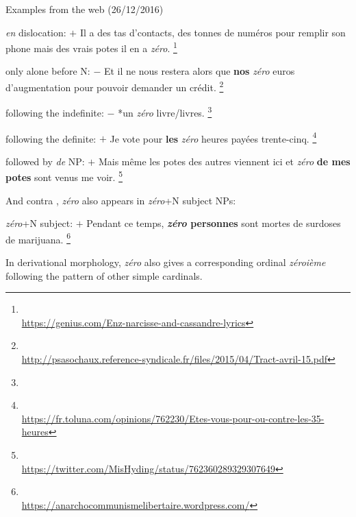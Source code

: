 \documentclass[output=paper]{langsci/langscibook}
\begin{document}
  
\newpage 
\ea\label{exampleZero} %
Examples from the web (26/12/2016)
\begin{description}
\item \emph{en} dislocation: $+$ \fldr{}  Il a des tas d'contacts, des tonnes de numéros pour remplir son phone mais des vrais potes il en a \emph{zéro}.%
\footnote{\\\protect\url{https://genius.com/Enz-narcisse-and-cassandre-lyrics}}
\item only alone before N: $-$ \fldr{} Et il ne nous restera alors que \textbf{nos} \emph{zéro} euros d'augmentation pour pouvoir demander un crédit.%
\footnote{\\\url{http://psasochaux.reference-syndicale.fr/files/2015/04/Tract-avril-15.pdf}}
\item following the indefinite: $-$ \fldr{} *un \emph{zéro} livre/livres.%
\footnote{}
\item following the definite: $+$ \fldr{}  Je vote pour \textbf{les} \emph{zéro} heures payées trente-cinq.%
\footnote{\\\url{https://fr.toluna.com/opinions/762230/Etes-vous-pour-ou-contre-les-35-heures}}
\item followed by \emph{de} NP: $+$ \fldr{}  Mais même les potes des autres viennent ici et \emph{zéro} \textbf{de mes potes} sont venus me voir.%
\footnote{\\\url{https://twitter.com/MisHyding/status/762360289329307649}}
\end{description}

\noindent And contra \citet{Saulnier10}, \emph{zéro} also appears in \emph{zéro}+N subject NPs:
\begin{description}
\item \emph{zéro}+N subject: $+$ \fldr{}  Pendant ce temps, \textbf{\emph{zéro} personnes} sont mortes de  surdoses de marijuana.%
\footnote{\\\url{https://anarchocommunismelibertaire.wordpress.com/}}
\end{description}
\z
In derivational morphology, \emph{zéro} also gives a corresponding ordinal \emph{zéroième} following the pattern of other simple cardinals.
\end{document}
